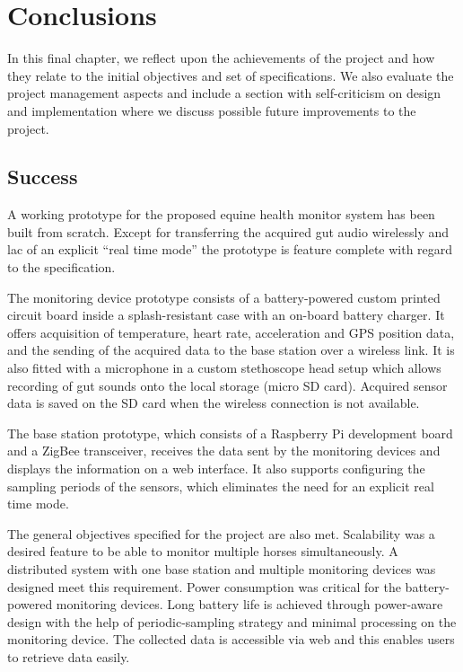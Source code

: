 \chapter{Conclusions}
\label{chap:conclusions}
In this final chapter, we reflect upon the achievements of the project and how they relate to the initial objectives and set of specifications. We also evaluate the project management aspects and include a section with self-criticism on design and implementation where we discuss possible future improvements to the project.

\section{Success}
\label{sec:success}
A working prototype for the proposed equine health monitor system has been built from scratch. Except for transferring the acquired gut audio wirelessly and lac of an explicit “real time mode” the prototype is feature complete with regard to the specification. 

The monitoring device prototype consists of a battery-powered custom printed circuit board inside a splash-resistant case with an on-board battery charger. It offers acquisition of temperature, heart rate, acceleration and GPS position data, and the sending of the acquired data to the base station over a wireless link. It is also fitted with a microphone in a custom stethoscope head setup which allows recording of gut sounds onto the local storage (micro SD card). Acquired sensor data is saved on the SD card when the wireless connection is not available.

The base station prototype, which consists of a Raspberry Pi development board and a ZigBee transceiver, receives the data sent by the monitoring devices and displays the information on a web interface. It also supports configuring the sampling periods of the sensors, which eliminates the need for an explicit real time mode.

The general objectives specified for the project are also met. Scalability was a desired feature to be able to monitor multiple horses simultaneously. A distributed system with one base station and multiple monitoring devices was designed meet this requirement. Power consumption was critical for the battery-powered monitoring devices. Long battery life is achieved through power-aware design with the help of periodic-sampling strategy and minimal processing on the monitoring device. The collected data is accessible via web and this enables users to retrieve data easily.  

